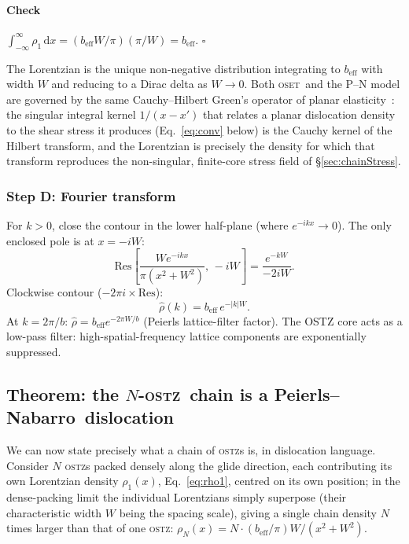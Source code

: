 \documentclass[3p]{elsarticle}
\newcommand{\OSTZ}{\textsc{ostz}}
\newcommand{\OSET}{\textsc{oset}}
\newcommand{\beff}{b_\mathrm{eff}}
\newcommand{\PN}{Peierls--Nabarro}
\begin{document}
\paragraph{Check}
$\int_{-\infty}^\infty\rho_1\,\mathrm dx=(\beff W/\pi)(\pi/W)=\beff$.
$\square$

The Lorentzian is the unique non-negative distribution integrating to
$\beff$ with width $W$ and reducing to a Dirac delta as $W\to0$.
Both \OSET\ and the P--N model are governed by the same
Cauchy--Hilbert Green's operator of planar
elasticity~\citep{muskhelishvili1953,bilby1963}: the singular
integral kernel $1/(x-x')$ that relates a planar dislocation
density to the shear stress it produces (Eq.~\eqref{eq:conv} below)
is the Cauchy kernel of the Hilbert transform, and the Lorentzian is
precisely the density for which that transform reproduces the
non-singular, finite-core stress field of \S\ref{sec:chainStress}.

\subsubsection{Step D: Fourier transform}
\label{sec:stepD-fourier}

For $k>0$, close the contour in the lower half-plane (where
$e^{-ikx}\to0$). The only enclosed pole is at $x=-iW$:
\[
  \mathrm{Res}\!\left[\frac{We^{-ikx}}{\pi(x^2+W^2)},\,-iW\right]
  =\frac{e^{-kW}}{-2iW}.
\]
Clockwise contour ($-2\pi i\times\text{Res}$):
\begin{equation}
  \hat\rho(k)=\beff\,e^{-|k|W}.
  \label{eq:rhohat}
\end{equation}
At $k=2\pi/b$: $\hat\rho=\beff e^{-2\pi W/b}$ (Peierls lattice-filter
factor). The OSTZ core acts as a low-pass filter: high-spatial-frequency
lattice components are exponentially suppressed.

\subsection{Theorem: the $N$-\OSTZ\ chain is a \PN\ dislocation}
\label{sec:PN}

We can now state precisely what a chain of \OSTZ s is, in dislocation
language. Consider $N$ \OSTZ s packed densely along the glide
direction, each contributing its own Lorentzian density
$\rho_1(x)$, Eq.~\eqref{eq:rho1}, centred on its own position; in the
dense-packing limit the individual Lorentzians simply superpose
(their characteristic width $W$ being the spacing scale), giving a
single chain density $N$ times larger than that of one \OSTZ:
$\rho_N(x)=N\cdot(\beff/\pi)W/(x^2+W^2)$.
\end{document}
